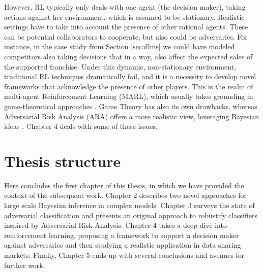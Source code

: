 However, RL typically only deals with one agent (the decision maker), taking actions against her environment, which is assumed to be stationary. Realistic settings have to take into account the presence of other rational agents. These can be potential collaborators to cooperate, but also could be adversaries. For instance, in the case study from Section \ref{sec:dlms} we could have modeled competitors also taking decisions that in a way, also affect the expected sales of the supported franchise. Under this dynamic, non-stationary environment, traditional RL techniques dramatically fail, and it is a necessity to develop novel frameworks that acknowledge the presence of other players. This is the realm of multi-agent Reinforcement Learning (MARL), which usually takes grounding in game-theoretical approaches \parencite{marl_over,lanctot2017unified}. Game Theory has also its own drawbacks, whereas Adversarial Risk Analysis (ARA) offers a more realistic view, leveraging Bayesian ideas \parencite{Banks}.
Chapter 4 deals with some of these issues.


\section{Thesis structure}

Here concludes the first chapter of this thesis, in which we have provided the context of the subsequent work. Chapter 2 describes two novel approaches for large scale Bayesian inference in complex models. Chapter 3 surveys the state of adversarial classification and presents an original approach to robustify classifiers inspired by Adversarial Risk Analysis. Chapter 4 takes a deep dive into reinforcement learning, proposing a framework to support a decision maker against adversaries and then studying a realistic application in data sharing markets.
Finally, Chapter 5 ends up with several conclusions and avenues for further work.